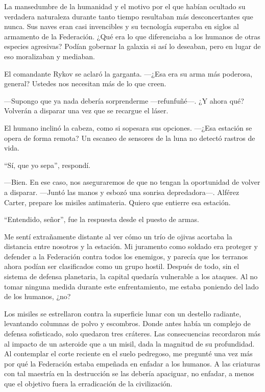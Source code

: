 La mansedumbre de la humanidad y el motivo por el que habían ocultado su verdadera naturaleza durante tanto tiempo resultaban más desconcertantes que nunca. Sus naves eran casi invencibles y su tecnología superaba en siglos al armamento de la Federación. ¿Qué era lo que diferenciaba a los humanos de otras especies agresivas? Podían gobernar la galaxia si así lo deseaban, pero en lugar de eso moralizaban y mediaban.

El comandante Rykov se aclaró la garganta. —¿Esa era su arma más poderosa, general? Ustedes nos necesitan más de lo que creen.

—Supongo que ya nada debería sorprenderme —refunfuñé—. ¿Y ahora qué? Volverán a disparar una vez que se recargue el láser.

El humano inclinó la cabeza, como si sopesara sus opciones. —¿Esa estación se opera de forma remota? Un escaneo de sensores de la luna no detectó rastros de vida.

``Sí, que yo sepa'', respondí.

—Bien. En ese caso, nos aseguraremos de que no tengan la oportunidad de volver a disparar. —Juntó las manos y esbozó una sonrisa depredadora—. Alférez Carter, prepare los misiles antimateria. Quiero que entierre esa estación.

``Entendido, señor'', fue la respuesta desde el puesto de armas.

Me sentí extrañamente distante al ver cómo un trío de ojivas acortaba la distancia entre nosotros y la estación. Mi juramento como soldado era proteger y defender a la Federación contra todos los enemigos, y parecía que los terranos ahora podían ser clasificados como un grupo hostil. Después de todo, sin el sistema de defensa planetaria, la capital quedaría vulnerable a los ataques. Al no tomar ninguna medida durante este enfrentamiento, me estaba poniendo del lado de los humanos, ¿no?

Los misiles se estrellaron contra la superficie lunar con un destello radiante, levantando columnas de polvo y escombros. Donde antes había un complejo de defensa sofisticado, solo quedaron tres cráteres. Las consecuencias recordaron más al impacto de un asteroide que a un misil, dada la magnitud de su profundidad. Al contemplar el corte reciente en el suelo pedregoso, me pregunté una vez más por qué la Federación estaba empeñada en enfadar a los humanos. A las criaturas con tal maestría en la destrucción se las debería apaciguar, no enfadar, a menos que el objetivo fuera la erradicación de la civilización.

